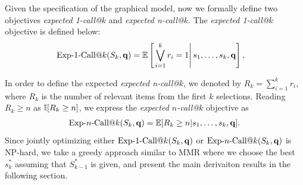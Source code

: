 Given the specification of the graphical model, now we formally define two objectives \emph{expected 1-call@$k$} and \emph{expected n-call@$k$}. The \emph{expected 1-call@$k$} objective is defined below: 
\begin{align}
\label{eq:setRelevance}
    \ExpOneCall(S_k,\vec{q}) & = \mathbb{E} \left[\left. \bigvee_{i=1}^{k}r_i=1 \right| s_{1},\dots, s_{k},\vec{q} \right], 
\end{align}

In order to define the expected \emph{expected n-call@$k$}, we denoted by $R_k = \sum_{i=1}^k r_i$, where $R_k$ is 
the number of relevant items from the first $k$ selections.  
Reading $R_k \geq n$ as $\mathbb{I}[R_k \geq n]$, we express the \emph{expected $n$-call@$k$} objective as 
\begin{align}
\label{eq:setRelevance}
  \ExpNCall{n}(S_k,\vec{q})
  = \mathbb{E}[R_k\geq n|s_1,\dots,s_k,\vec{q}] .  
\end{align}
Since jointly optimizing either $\ExpOneCall(S_k,\vec{q})$ or $\ExpNCall{n}(S_k,\vec{q})$ is NP-hard, we
take a greedy approach similar to MMR where we choose the best $s_k^*$
assuming that $S_{k-1}^*$ is given, and present the main derivaiton results in the following section. 
